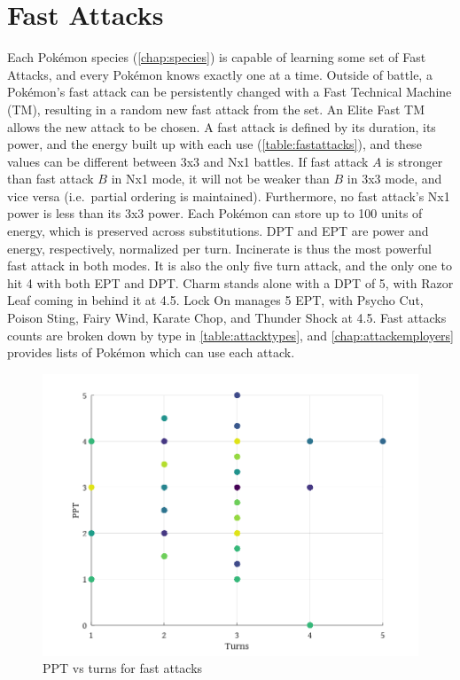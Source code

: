 \section{Fast Attacks}
Each Pokémon species (\autoref{chap:species}) is capable of learning some set of Fast Attacks, 
  and every Pokémon knows exactly one at a time.
Outside of battle, a Pokémon's fast attack can be persistently changed with a
  Fast Technical Machine (TM), resulting in a random new fast attack from the set.
An Elite Fast TM allows the new attack to be chosen.
A fast attack is defined by its duration, its power, and the energy built up with each use (\autoref{table:fastattacks}),
  and these values can be different between 3x3 and Nx1 battles.
If fast attack $A$ is stronger than fast attack $B$ in Nx1 mode, it will not be
  weaker than $B$ in 3x3 mode, and vice versa (i.e.\ partial ordering is maintained).
Furthermore, no fast attack's Nx1 power is less than its 3x3 power.
Each Pokémon can store up to 100 units of energy, which is preserved across substitutions.
DPT and EPT are power and energy, respectively, normalized per turn.
Incinerate is thus the most powerful fast attack in both modes.
It is also the only five turn attack, and the only one to hit 4 with both EPT and DPT\@.
Charm stands alone with a DPT of 5, with Razor Leaf coming in behind it at 4.5.
Lock On manages 5 EPT, with Psycho Cut, Poison Sting, Fairy Wind, Karate Chop,
  and Thunder Shock at 4.5.
Fast attacks counts are broken down by type in \autoref{table:attacktypes},
 and \autoref{chap:attackemployers} provides lists of Pokémon which can use each attack.



\begin{figure}[ht]
\includegraphics[keepaspectratio,width=\textwidth]{octave/pptvst.png}
\caption{PPT vs turns for fast attacks}
\label{fig:pptvst}
\end{figure}

